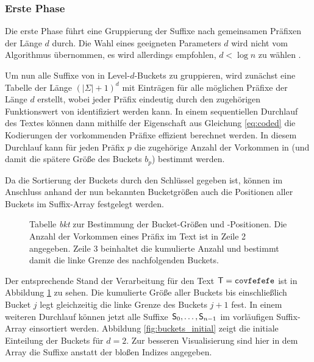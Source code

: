 \subsubsection{Erste Phase}
\label{bpr:algorithmus:phase1}

Die erste Phase führt eine Gruppierung der Suffixe nach gemeinsamen Präfixen der Länge \(d\) durch. Die Wahl eines geeigneten Parameters \(d\) wird nicht vom Algorithmus übernommen, es wird allerdings empfohlen, \(d < \log n\) zu wählen \cite{saca:2}.\par
Um nun alle Suffixe von  in Level-\(d\)-Buckets zu gruppieren, wird zunächst eine Tabelle \bkt der Länge \((|\Sigma| + 1)^d\) mit Einträgen für alle möglichen Präfixe der Länge \(d\) erstellt, wobei jeder Präfix eindeutig durch den zugehörigen Funktionswert von \coded identifiziert werden kann. In einem sequentiellen Durchlauf des Textes  können dann mithilfe der Eigenschaft aus Gleichung \ref{eq:coded} die Kodierungen der vorkommenden Präfixe effizient berechnet werden. In diesem Durchlauf kann für jeden Präfix \(p\) die zugehörige Anzahl der Vorkommen in  (und damit die spätere Größe des Buckets \(b_p\)) bestimmt werden.\par
Da die Sortierung der Buckets durch den Schlüssel \coded gegeben ist, können im Anschluss anhand der nun bekannten Bucketgrößen auch die Positionen aller Buckets im Suffix-Array festgelegt werden.
\begin{figure}[ht]
	\vspace{0.2\baselineskip}
	\caption[Tabelle \emph{bkt} zur Bestimmung der Bucket-Größen und -Positionen]{Tabelle \emph{bkt} zur Bestimmung der Bucket-Größen und -Positionen. Die Anzahl der Vorkommen eines Präfix im Text ist in Zeile 2 angegeben. Zeile 3 beinhaltet die kumulierte Anzahl und bestimmt damit die linke Grenze des nachfolgenden Buckets.}
	\label{fig:bkt}
\end{figure}
Der entsprechende Stand der Verarbeitung für den Text \(\inputtext = \covfefefe\) ist in Abbildung \ref{fig:bkt} zu sehen. Die kumulierte Größe aller Buckets bis einschließlich Bucket \(j\) legt gleichzeitig die linke Grenze des Buckets \(j+1\) fest. In einem weiteren Durchlauf können jetzt alle Suffixe \(\mathsf{S}_{0}, \ldots, \mathsf{S}_{n-1}\) im vorläufigen Suffix-Array \sa einsortiert werden. Abbildung \ref{fig:buckets_initial} zeigt die initiale Einteilung der Buckets für \(d=2\). Zur besseren Visualisierung sind hier in dem Array die Suffixe anstatt der bloßen Indizes angegeben.\par\smallskip
